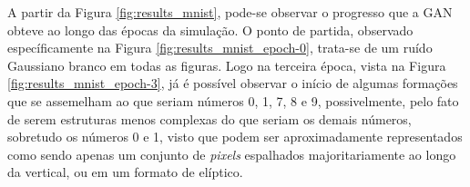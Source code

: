 A partir da Figura \ref{fig:results_mnist}, pode-se observar o progresso que a GAN obteve ao longo das épocas da simulação. O ponto de partida, observado específicamente na Figura \ref{fig:results_mnist_epoch-0}, trata-se de um ruído Gaussiano branco em todas as figuras. Logo na terceira época, vista na Figura \ref{fig:results_mnist_epoch-3}, já é possível observar o início de algumas formações que se assemelham ao que seriam números 0, 1, 7, 8 e 9, possivelmente, pelo fato de serem estruturas menos complexas do que seriam os demais números, sobretudo os números 0 e 1, visto que podem ser aproximadamente representados como sendo apenas um conjunto de \textit{pixels} espalhados majoritariamente ao longo da vertical, ou em um formato de elíptico.


\begin{figure}[H]
    \centering
    \hspace{0.5cm}
    \\
    \vspace{0.5cm}
\end{figure}
